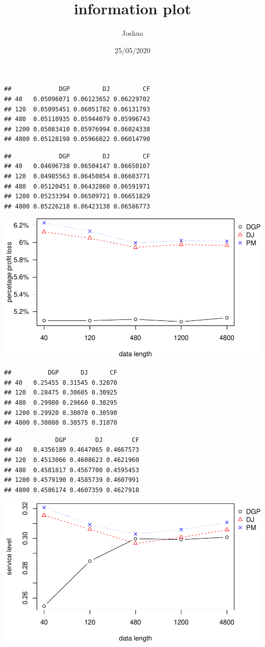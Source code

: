 \documentclass[
]{article}
\title{information plot}
\author{Joshua}
\date{25/05/2020}
\begin{document}
\maketitle

\begin{verbatim}
##             DGP         DJ         CF
## 40   0.05096071 0.06123652 0.06229702
## 120  0.05095451 0.06051782 0.06131793
## 480  0.05110935 0.05944079 0.05996743
## 1200 0.05083410 0.05976994 0.06024338
## 4800 0.05128198 0.05966022 0.06014790
\end{verbatim}

\begin{verbatim}
##             DGP         DJ         CF
## 40   0.04696738 0.06504147 0.06650107
## 120  0.04985563 0.06450854 0.06603771
## 480  0.05120451 0.06432860 0.06591971
## 1200 0.05233394 0.06509721 0.06651829
## 4800 0.05226218 0.06423138 0.06586773
\end{verbatim}

\includegraphics{information-plot_files/figure-latex/AR(1)ppl-1.pdf}

\begin{verbatim}
##          DGP      DJ      CF
## 40   0.25455 0.31545 0.32070
## 120  0.28475 0.30605 0.30925
## 480  0.29980 0.29660 0.30295
## 1200 0.29920 0.30070 0.30590
## 4800 0.30080 0.30575 0.31070
\end{verbatim}

\begin{verbatim}
##            DGP        DJ        CF
## 40   0.4356189 0.4647065 0.4667573
## 120  0.4513066 0.4608623 0.4621960
## 480  0.4581817 0.4567700 0.4595453
## 1200 0.4579190 0.4585739 0.4607991
## 4800 0.4586174 0.4607359 0.4627918
\end{verbatim}

\includegraphics{information-plot_files/figure-latex/AR(1)sl-1.pdf}
\end{document}
